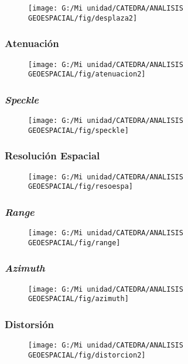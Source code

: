 \documentclass[14pt]{beamer}
\begin{document}
\begin{frame}
 \begin{figure}
    \centering
    \texttt{[image: G:/Mi unidad/CATEDRA/ANALISIS GEOESPACIAL/fig/desplaza2]}
  \end{figure}
\end{frame}
\begin{frame}
\frametitle{Atenuación}
 \begin{figure}
    \centering
    \texttt{[image: G:/Mi unidad/CATEDRA/ANALISIS GEOESPACIAL/fig/atenuacion2]}
  \end{figure}
\end{frame}
\begin{frame}
\frametitle{\emph{Speckle}}
 \begin{figure}
    \centering
    \texttt{[image: G:/Mi unidad/CATEDRA/ANALISIS GEOESPACIAL/fig/speckle]}
  \end{figure}
\end{frame}
\begin{frame}
\frametitle{Resolución Espacial}
 \begin{figure}
    \centering
    \texttt{[image: G:/Mi unidad/CATEDRA/ANALISIS GEOESPACIAL/fig/resoespa]}
  \end{figure}
\end{frame}
\begin{frame}
\frametitle{\emph{Range}}
 \begin{figure}
    \centering
    \texttt{[image: G:/Mi unidad/CATEDRA/ANALISIS GEOESPACIAL/fig/range]}
  \end{figure}
\end{frame}
\begin{frame}
\frametitle{\emph{Azimuth}}
 \begin{figure}
    \centering
    \texttt{[image: G:/Mi unidad/CATEDRA/ANALISIS GEOESPACIAL/fig/azimuth]}
  \end{figure}
\end{frame}
\begin{frame}
\frametitle{Distorsión}
 \begin{figure}
    \centering
    \texttt{[image: G:/Mi unidad/CATEDRA/ANALISIS GEOESPACIAL/fig/distorcion2]}
  \end{figure}
\end{frame}
\end{document}
